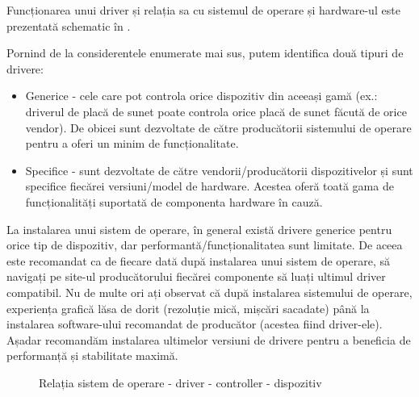 Funcționarea unui driver și relația sa cu sistemul de operare și hardware-ul este prezentată schematic în .

Pornind de la considerentele enumerate mai sus, putem identifica două tipuri de drivere:

\begin{itemize}
	\item Generice - cele care pot controla orice dispozitiv din aceeași
		gamă (ex.: driverul de placă de sunet poate controla orice placă
		de sunet făcută de orice vendor). De obicei sunt dezvoltate de
		către producătorii sistemului de operare pentru a oferi un minim
		de funcționalitate.
	\item Specifice - sunt dezvoltate de către vendorii/producătorii
		dispozitivelor și sunt specifice fiecărei versiuni/model de
		hardware. Acestea oferă toată gama de funcționalități suportată
		de componenta hardware în cauză.
\end{itemize}


La instalarea unui sistem de operare, în general există drivere generice pentru
orice tip de dispozitiv, dar performantă/funcționalitatea sunt limitate. De
aceea este recomandat ca de fiecare dată după instalarea unui sistem de operare,
să navigați pe site-ul producătorului fiecărei componente să luați ultimul
driver compatibil. Nu de multe ori ați observat că după instalarea sistemului de
operare, experiența grafică lăsa de dorit (rezoluție mică, mișcări sacadate)
până la instalarea software-ului recomandat de producător (acestea fiind
driver-ele). Așadar recomandăm instalarea ultimelor versiuni de drivere pentru
a beneficia de performanță și stabilitate maximă.

\begin{figure}[htbp]
	\centering
	\def\svgwidth{\columnwidth}
	
	\caption{Relația sistem de operare - driver - controller - dispozitiv}
	\label{fig:hw-so-driver}
\end{figure}

